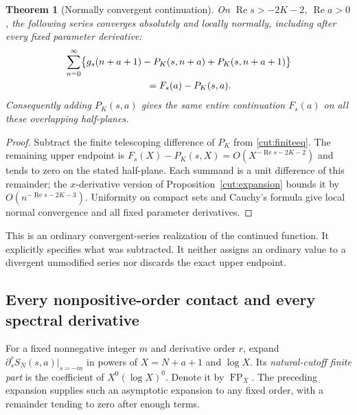 \documentclass[11pt]{article}
\newtheorem{theorem}{Theorem}[section]
\theoremstyle{definition}
\theoremstyle{remark}
\numberwithin{equation}{section}
\newcommand{\FP}{\operatorname{FP}}
\newcommand{\Rea}{\operatorname{Re}}
\begin{document}
\begin{theorem}[Normally convergent continuation]\label{cut:normal}
On $\Rea s>-2K-2$, $\Rea a>0$, the following series converges absolutely
and locally normally, including after every fixed parameter derivative:
\begin{align}
 &\sum_{n=0}^{\infty}\bigl\{
    g_s(n+a+1)-P_K(s,n+a)+P_K(s,n+a+1)\bigr\}\notag\\
 &\hspace{30mm}=F_s(a)-P_K(s,a).
 \label{cut:normaleq}
\end{align}
Consequently adding $P_K(s,a)$ gives the same entire continuation
$F_s(a)$ on all these overlapping half-planes.
\end{theorem}
\begin{proof}
Subtract the finite telescoping difference of $P_K$ from
\eqref{cut:finiteeq}. The remaining upper endpoint is
$F_s(X)-P_K(s,X)=O(X^{-\Rea s-2K-2})$ and tends to zero on the stated
half-plane. Each summand is a unit difference of this remainder; the
$x$-derivative version of Proposition~\ref{cut:expansion} bounds it by
$O(n^{-\Rea s-2K-3})$. Uniformity on compact sets and Cauchy's formula
give local normal convergence and all fixed parameter derivatives.
\end{proof}

This is an ordinary convergent-series realization of the continued
function. It explicitly specifies what was subtracted. It neither assigns
an ordinary value to a divergent unmodified series nor discards the exact
upper endpoint.

\subsection{Every nonpositive-order contact and every spectral derivative}

For a fixed nonnegative integer $m$ and derivative order $r$, expand
$\partial_s^rS_N(s,a)|_{s=-m}$ in powers of $X=N+a+1$ and $\log X$.
Its \emph{natural-cutoff finite part} is the coefficient of
$X^0(\log X)^0$. Denote it by $\FP_X$.
The preceding expansion supplies such an asymptotic expansion to any
fixed order, with a remainder tending to zero after enough terms.
\end{document}
